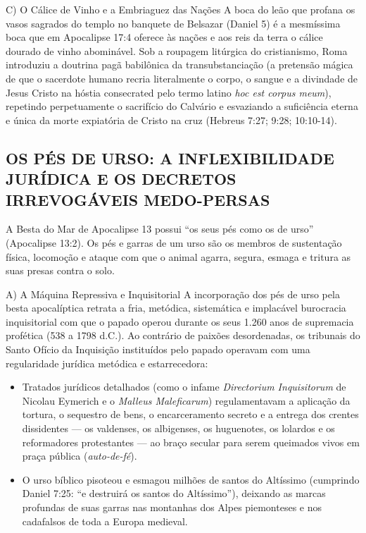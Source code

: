 C) O Cálice de Vinho e a Embriaguez das Nações
A boca do leão que profana os vasos sagrados do templo no banquete de Belsazar (Daniel 5) é a mesmíssima boca que em Apocalipse 17:4 oferece às nações e aos reis da terra o cálice dourado de vinho abominável. Sob a roupagem litúrgica do cristianismo, Roma introduziu a doutrina pagã babilônica da transubstanciação (a pretensão mágica de que o sacerdote humano recria literalmente o corpo, o sangue e a divindade de Jesus Cristo na hóstia consecrated pelo termo latino \textit{hoc est corpus meum}), repetindo perpetuamente o sacrifício do Calvário e esvaziando a suficiência eterna e única da morte expiatória de Cristo na cruz (Hebreus 7:27; 9:28; 10:10-14).



\subsection{OS PÉS DE URSO: A INFLEXIBILIDADE JURÍDICA E OS DECRETOS IRREVOGÁVEIS MEDO-PERSAS}


A Besta do Mar de Apocalipse 13 possui ``os seus pés como os de urso'' (Apocalipse 13:2). Os pés e garras de um urso são os membros de sustentação física, locomoção e ataque com que o animal agarra, segura, esmaga e tritura as suas presas contra o solo.

A) A Máquina Repressiva e Inquisitorial
A incorporação dos pés de urso pela besta apocalíptica retrata a fria, metódica, sistemática e implacável burocracia inquisitorial com que o papado operou durante os seus 1.260 anos de supremacia profética (538 a 1798 d.C.). Ao contrário de paixões desordenadas, os tribunais do Santo Ofício da Inquisição instituídos pelo papado operavam com uma regularidade jurídica metódica e estarrecedora:
\begin{itemize}
  \item Tratados jurídicos detalhados (como o infame \textit{Directorium Inquisitorum} de Nicolau Eymerich e o \textit{Malleus Maleficarum}) regulamentavam a aplicação da tortura, o sequestro de bens, o encarceramento secreto e a entrega dos crentes dissidentes — os valdenses, os albigenses, os huguenotes, os lolardos e os reformadores protestantes — ao braço secular para serem queimados vivos em praça pública (\textit{auto-de-fé}).
  \item O urso bíblico pisoteou e esmagou milhões de santos do Altíssimo (cumprindo Daniel 7:25: ``e destruirá os santos do Altíssimo''), deixando as marcas profundas de suas garras nas montanhas dos Alpes piemonteses e nos cadafalsos de toda a Europa medieval.
\end{itemize}


